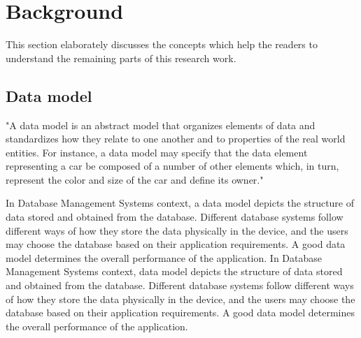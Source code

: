 

	\let\cleardoublepage\clearpage
    \chapter{Background} \label{background}
    This section elaborately discusses the concepts which help the readers to understand the remaining parts of this research work.
    
    \section{Data model}
    
    "A data model is an abstract model that organizes elements of data and standardizes how they relate to one another and to properties of the real world entities. For instance, a data model may specify that the data element representing a car be composed of a number of other elements which, in turn, represent the color and size of the car and define its owner." \cite{misc08}
    
    In Database Management Systems context, a data model depicts the structure of data stored and obtained from the database. Different database systems follow different ways of how they store the data physically in the device, and the users may choose the database based on their application requirements. A good data model determines the overall performance of the application. In Database Management Systems context, data model depicts the structure of data stored and obtained from the database. Different database systems follow different ways of how they store the data physically in the device, and the users may choose the database based on their application requirements. A good data model determines the overall performance of the application. 
    
